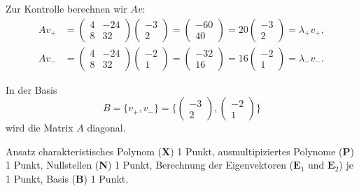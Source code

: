 \begin{loesung}
Zur Kontrolle berechnen wir $Av$:
\begin{align*}
Av_+
&=
\begin{pmatrix}4&-24\\8&32 \end{pmatrix}
\begin{pmatrix}-3\\2 \end{pmatrix}
=
\begin{pmatrix}
-60\\40
\end{pmatrix}
=
20
\begin{pmatrix}-3\\2 \end{pmatrix}
=
\lambda_+v_+,
\\
Av_-
&=
\begin{pmatrix}4&-24\\8&32 \end{pmatrix}
\begin{pmatrix}-2\\1 \end{pmatrix}
=
\begin{pmatrix}
-32\\16
\end{pmatrix}
=
16\begin{pmatrix}-2\\1\end{pmatrix}
=
\lambda_-v_-.
\end{align*}

In der Basis 
\[
B=\{v_+,v_-\}
=
\biggl\{
\begin{pmatrix}-3\\2 \end{pmatrix},
\begin{pmatrix}-2\\1 \end{pmatrix}
\biggr\}
\]
wird die Matrix $A$ diagonal.
\end{loesung}



\begin{bewertung}
Ansatz charakteristisches Polynom ({\bf X}) 1 Punkt,
ausmultipiziertes Polynome ({\bf P}) 1 Punkt,
Nullstellen ({\bf N}) 1 Punkt,
Berechnung der Eigenvektoren ($\textbf{E}_1$ und $\textbf{E}_2$) je 1 Punkt,
Basis ({\bf B}) 1 Punkt.
\end{bewertung}

